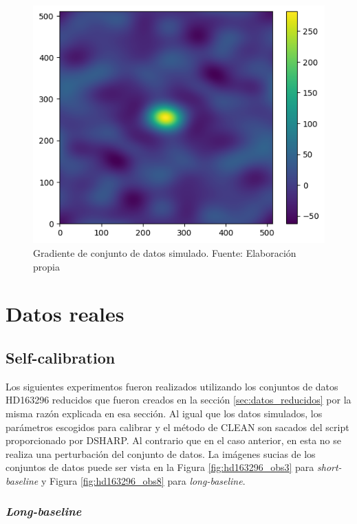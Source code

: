 \begin{figure}[!ht]
	\centering
	\captionsetup{justification=centering}
	\includegraphics[scale=0.45]{images/grad_sim.png}
	\caption[Gradiente de conjunto de datos simulado]{Gradiente de conjunto de datos simulado. Fuente: Elaboración propia}
	\label{fig:grad_sim}
\end{figure}

\section{Datos reales}


\subsection{Self-calibration}

Los siguientes experimentos fueron realizados utilizando los conjuntos de datos HD163296 reducidos que fueron creados en la sección \ref{sec:datos_reducidos} por la misma razón explicada en esa sección. Al igual que los datos simulados, los parámetros escogidos para calibrar y el método de CLEAN son sacados del script proporcionado por DSHARP. Al contrario que en el caso anterior, en esta no se realiza una perturbación del conjunto de datos. La imágenes sucias de los conjuntos de datos puede ser vista en la Figura \ref{fig:hd163296_obs3} para \textit{short-baseline} y  Figura \ref{fig:hd163296_obs8} para \textit{long-baseline}.

\subsubsection{\textit{Long-baseline}}

